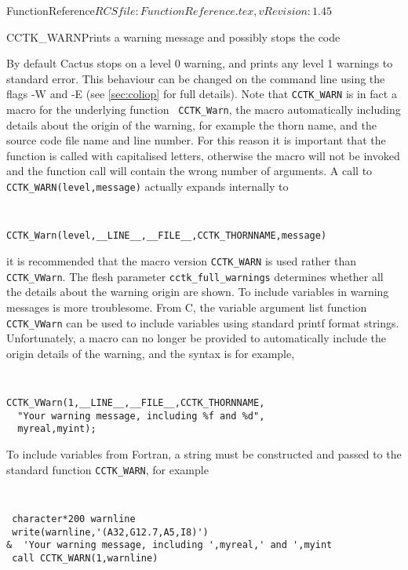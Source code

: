 \begin{cactuspart}{5}{FunctionReference}{$RCSfile: FunctionReference.tex,v $}{$Revision: 1.45 $}
\begin{CCTKFunc}{CCTK\_WARN}{Prints a warning message and possibly stops the code}
\label{CCTK-WARN}
\subroutine{}{}{}
\showargs
\begin{params}
\end{params}
\begin{discussion}
By default Cactus stops on a level 0 warning, and prints any level 1 warnings
to standard error. This behaviour can be changed on the command line using
the flags -W and -E (see \ref{sec:coliop} for full details). Note that
{\tt CCTK\_WARN} is in fact a macro for the underlying function {\tt
CCTK\_Warn}, the macro automatically including details about the origin
of the warning, for example the thorn name, and the source code file
name and line number. For this reason it is important that the function
is called with capitalised letters, otherwise the macro will not be invoked
and the function call will contain the wrong number of arguments. A call to
{\tt CCTK\_WARN(level,message)} actually expands internally to
{\tt
\begin{verbatim}
CCTK_Warn(level,__LINE__,__FILE__,CCTK_THORNNAME,message)
\end{verbatim}
}
it is recommended that the macro version {\tt CCTK\_WARN} is used rather
than {\tt CCTK\_VWarn}.
The flesh parameter {\tt cctk\_full\_warnings}
determines whether all the details about the warning origin are shown.
To include variables in warning messages is more troublesome. From C, the
variable argument list
function {\tt CCTK\_VWarn} can be used to include variables using standard printf format strings. Unfortunately, a macro can no
longer be provided to automatically include the origin details of the warning,
and the syntax is for example,
{\tt
\begin{verbatim}
CCTK_VWarn(1,__LINE__,__FILE__,CCTK_THORNNAME,
  "Your warning message, including %f and %d",
  myreal,myint);
\end{verbatim}
}
To include variables from Fortran, a string must be constructed and passed
to the standard function {\tt CCTK\_WARN}, for example
{\tt
\begin{verbatim}
 character*200 warnline
 write(warnline,'(A32,G12.7,A5,I8)')
&  'Your warning message, including ',myreal,' and ',myint
 call CCTK_WARN(1,warnline)
\end{verbatim}
}
\end{discussion}
\end{CCTKFunc}
\end{cactuspart}
